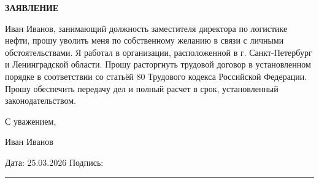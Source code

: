\documentclass[12pt]{article}
\begin{document}
\begin{center}
\textbf{\LARGE ЗАЯВЛЕНИЕ}
\end{center}

\vspace{1cm}

Иван Иванов, занимающий должность заместителя директора по логистике нефти, прошу уволить меня по собственному желанию в связи с личными обстоятельствами. Я работал в организации, расположенной в г. Санкт-Петербург и Ленинградской области. Прошу расторгнуть трудовой договор в установленном порядке в соответствии со статьёй 80 Трудового кодекса Российской Федерации. Прошу обеспечить передачу дел и полный расчет в срок, установленный законодательством.

\bigskip

С уважением,

Иван Иванов

\vfill

\noindent
Дата: 25.03.2026 \hfill Подпись: \rule{5cm}{0.4pt}
\end{document}
